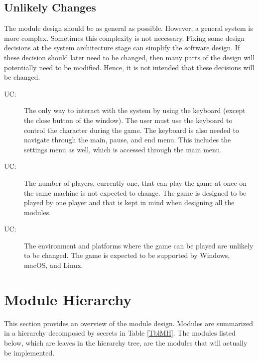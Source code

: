 \documentclass[12pt, titlepage]{article}
\newcounter{ucnum}
\newcommand{\uctheucnum}{UC\theucnum}
\begin{document}
\subsection{Unlikely Changes} \label{SecUchange}

The module design should be as general as possible. However, a general system is
more complex. Sometimes this complexity is not necessary. Fixing some design
decisions at the system architecture stage can simplify the software design. If
these decision should later need to be changed, then many parts of the design
will potentially need to be modified. Hence, it is not intended that these
decisions will be changed.

\begin{description}
\item[ \uctheucnum \label{ucIO}:] The only way to interact with the system by using the keyboard (except the close button of the window). The user must use the keyboard to control the character during the game. The keyboard is also needed to navigate through the main, pause, and end menu. This includes the settings menu as well, which is accessed through the main menu.
\item[ \uctheucnum \label{ucInput}:] The number of players, currently one, that can play the game at once on the same machine is not expected to change. The game is designed to be played by one player and that is kept in mind when designing all the modules.
\item[ \uctheucnum \label{ucInput}:] The environment and platforms where the game can be played are unlikely to be changed. The game is expected to be supported by Windows, macOS, and Linux. 
\end{description}


\section{Module Hierarchy} \label{SecMH}

This section provides an overview of the module design. Modules are summarized
in a hierarchy decomposed by secrets in Table \ref{TblMH}. The modules listed
below, which are leaves in the hierarchy tree, are the modules that will
actually be implemented.
\end{document}
